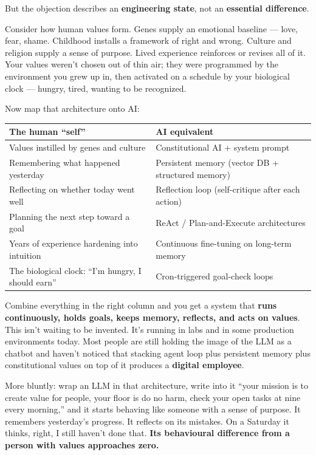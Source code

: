 \documentclass[11pt,a4paper]{article}
\begin{document}
But the objection describes an \textbf{engineering state}, not an \textbf{essential difference}.

Consider how human values form. Genes supply an emotional baseline --- love, fear, shame. Childhood installs a framework of right and wrong. Culture and religion supply a sense of purpose. Lived experience reinforces or revises all of it. Your values weren't chosen out of thin air; they were programmed by the environment you grew up in, then activated on a schedule by your biological clock --- hungry, tired, wanting to be recognized.

Now map that architecture onto AI:

\begin{center}

\begin{tabularx}{\textwidth}{lX}
\toprule
The human ``self'' & AI equivalent \\
\midrule
Values instilled by genes and culture & Constitutional AI + system prompt \\
Remembering what happened yesterday & Persistent memory (vector DB + structured memory) \\
Reflecting on whether today went well & Reflection loop (self-critique after each action) \\
Planning the next step toward a goal & ReAct / Plan-and-Execute architectures \\
Years of experience hardening into intuition & Continuous fine-tuning on long-term memory \\
The biological clock: ``I'm hungry, I should earn'' & Cron-triggered goal-check loops \\
\bottomrule
\end{tabularx}
\end{center}

Combine everything in the right column and you get a system that \textbf{runs continuously, holds goals, keeps memory, reflects, and acts on values}. This isn't waiting to be invented. It's running in labs and in some production environments today. Most people are still holding the image of the LLM as a chatbot and haven't noticed that stacking agent loop plus persistent memory plus constitutional values on top of it produces a \textbf{digital employee}.

More bluntly: wrap an LLM in that architecture, write into it ``your mission is to create value for people, your floor is do no harm, check your open tasks at nine every morning,'' and it starts behaving like someone with a sense of purpose. It remembers yesterday's progress. It reflects on its mistakes. On a Saturday it thinks, right, I still haven't done that. \textbf{Its behavioural difference from a person with values approaches zero.}
\end{document}
